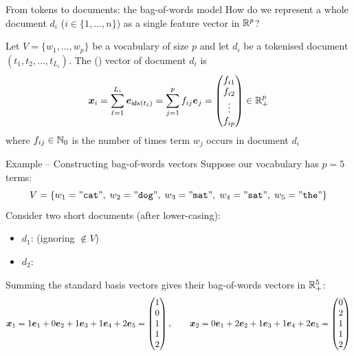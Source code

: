\documentclass[aspectratio=169]{beamer}\usepackage[]{graphicx}\usepackage[]{xcolor}
\begin{document}
\begin{frame}{From tokens to documents: the bag-of-words model}
How do we represent a whole document $d_i$ ($i \in \{1, \ldots, n\}$) as a single feature vector in $\mathbb{R}^p$?
\vfill
\begin{importantdefinition}
Let $V = \{w_1, \ldots, w_p\}$ be a vocabulary of size $p$ and let $d_i$ be a tokenised document $(t_1, t_2, \ldots, t_{L_i})$. The  () vector of document $d_i$ is
\[
\bm{x}_i = \sum_{\ell=1}^{L_i} \bm{e}_{\mathsf{idx}(t_\ell)} = \sum_{j=1}^p f_{ij} \bm{e}_j =
\begin{pmatrix}
f_{i1} \\ f_{i2} \\ \vdots \\ f_{ip}
\end{pmatrix} \in \mathbb{R}_+^p
\]
where $f_{ij} \in \mathbb{N}_0$ is the number of times term $w_j$ occurs in document $d_i$
\end{importantdefinition}
\end{frame}


\begin{frame}{Example -- Constructing bag-of-words vectors}
Suppose our vocabulary has $p = 5$ terms:
\[
V = \{w_1={\tt "cat"},\; w_2={\tt "dog"},\; w_3={\tt "mat"},\; w_4={\tt "sat"},\; w_5={\tt "the"}\}
\]
\vfill
Consider two short documents (after lower-casing):
\begin{itemize}
\item $d_1$:  (ignoring  $\notin V$)
\item $d_2$: 
\end{itemize}
\vfill
Summing the standard basis vectors gives their bag-of-words vectors in $\mathbb{R}_+^5$:
\[
\bm{x}_1 = 1\bm{e}_1 + 0\bm{e}_2 + 1\bm{e}_3 + 1\bm{e}_4 + 2\bm{e}_5 = \begin{pmatrix} 1 \\ 0 \\ 1 \\ 1 \\ 2 \end{pmatrix}, \qquad
\bm{x}_2 = 0\bm{e}_1 + 2\bm{e}_2 + 1\bm{e}_3 + 1\bm{e}_4 + 2\bm{e}_5 = \begin{pmatrix} 0 \\ 2 \\ 1 \\ 1 \\ 2 \end{pmatrix}
\]
\end{frame}
\end{document}
